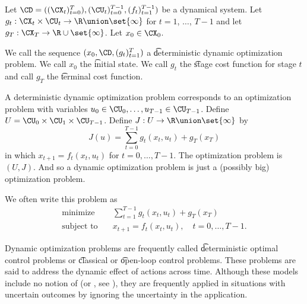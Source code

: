 


Let $\CD = ((\CX_t)_{t = 0}^{T}), (\CU_t)_{t=0}^{T-1}, (f_t)_{t=1}^{T-1})$ be a dynamical system.
Let $g_t: \CX_t \times \CU_t \to \R \union \set{\infty}$ for $t = 1$, $\dots$, $T-1$ and let $g_{T}: \CX_T \to \R \cup \set{\infty}$.
Let $x_0 \in \CX_0$.

We call the sequence $(x_0, \CD, (g_t)_{t = 1}^{T})$ a \t{deterministic dynamic optimization problem}.
We call $x_0$ the \t{initial state}.
We call $g_t$ the \t{stage cost function} for stage $t$ and call $g_T$ the \t{terminal cost function}.

A deterministic dynamic optimization problem corresponds to an optimization problem with variables $u_0 \in \CU_0, \dots, u_{T-1} \in \CU_{T-1}$.
Define $U = \CU_0 \times \CU_1 \times \CU_{T-1}$.
Define $J: U \to \R \union \set{\infty}$ by
\[
    J(u) = \sum_{t = 0}^{T-1} g_t(x_t, u_t) + g_T(x_T)
\]
in which $x_{t+1} = f_t(x_t, u_t)$ for $t = 0, \dots, T-1$.
The optimization problem is $(U, J)$.
And so a dynamic optimization problem is just a (possibly big) optimization problem.


We often write this problem as
\[
  \begin{aligned}
  \text{minimize}\quad & \sum_{t = 1}^{T-1} g_t(x_t, u_t) + g_T(x_T) \\
  \text{subject to}\quad & x_{t+1} = f_t(x_t, u_t), \quad t = 0, \dots, T-1.
  \end{aligned}
\]


Dynamic optimization problems are frequently called \t{deterministic optimal control} problems or \t{classical} or \t{open-loop control} problems.
These problems are said to address the dynamic effect of actions across time.
Although these models include no notion of  (or , see ), they are frequently applied in situations with uncertain outcomes by ignoring the uncertainty in the application.

\blankpage
